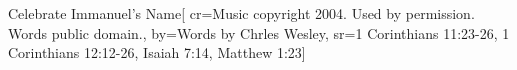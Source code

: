 {Celebrate Immanuel's Name}[
    cr={Music copyright 2004.  Used by permission.  Words public domain.},
    by={Words by Chrles Wesley},
    sr={1 Corinthians 11:23-26, 1 Corinthians 12:12-26, Isaiah 7:14, Matthew 1:23}]
